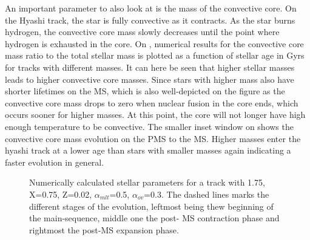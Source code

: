 An important parameter to also look at is the mass of the convective core. On the Hyashi track, the star is fully convective as it contracts. As the star burns hydrogen, the convective core mass slowly decreases until the point where hydrogen is exhausted in the core.  On , numerical results for the convective core mass ratio to the total stellar mass is plotted as a function of stellar age in Gyrs for tracks with different masses. It can here be seen that higher stellar masses leads to higher convective core masses. Since stars with higher mass also have shorter lifetimes on the MS, which is also well-depicted on the figure as the convective core mass drops to zero when nuclear fusion in the core ends, which occurs sooner for higher masses. At this point, the core will not longer have high enough temperature to be convective. The smaller inset window on  shows the convective core mass evolution on the PMS to the MS. Higher masses enter the hyashi track at a lower age than stars with smaller masses again indicating a faster evolution in general.  

\begin{figure}[htbp]
    \centering
    \caption{Numerically calculated stellar parameters for a track with 1.75\msun, X=0.75, Z=0.02, $\alpha_{mlt}$=0.5, $\alpha_{ov}$=0.3. The dashed lines marks the different stages of the evolution, leftmost being thew beginning of the main-sequence, middle one the post- MS contraction phase and rightmost the post-MS expansion phase.}
    \label{stellarparams}
\end{figure}


